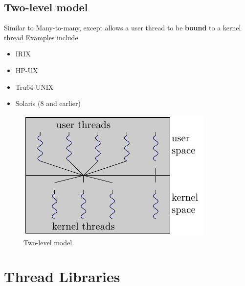 \documentclass[oneside]{book}
\begin{document}
            \subsection{Two-level model}
                Similar to Many-to-many, except allows a user thread to be \textbf{bound} to a kernel thread
                Examples include
                \begin{itemize}
                    \item IRIX
                    \item HP-UX
                    \item Tru64 UNIX
                    \item Solaris (8 and earlier)
                \end{itemize}
                \begin{figure}[H]
                    \centering
                    \includegraphics{figures/two_level.pdf}
                    \caption{Two-level model}
                \end{figure}
        \section{Thread Libraries}
\end{document}
